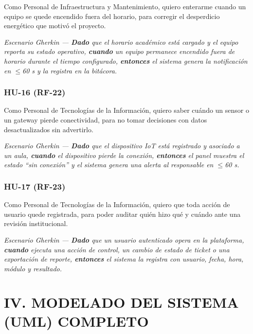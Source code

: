 
Como Personal de Infraestructura y Mantenimiento, quiero enterarme cuando un equipo se quede encendido fuera del horario, para corregir el desperdicio energético que motivó el proyecto.

\textit{Escenario Gherkin --- \textbf{Dado} que el horario académico está cargado y el equipo reporta su estado operativo, \textbf{cuando} un equipo permanece encendido fuera de horario durante el tiempo configurado, \textbf{entonces} el sistema genera la notificación en $\leq$60 s y la registra en la bitácora.}

\subsubsection*{HU-16 (RF-22)}


Como Personal de Tecnologías de la Información, quiero saber cuándo un sensor o un gateway pierde conectividad, para no tomar decisiones con datos desactualizados sin advertirlo.

\textit{Escenario Gherkin --- \textbf{Dado} que el dispositivo IoT está registrado y asociado a un aula, \textbf{cuando} el dispositivo pierde la conexión, \textbf{entonces} el panel muestra el estado ``sin conexión'' y el sistema genera una alerta al responsable en $\leq$60 s.}

\subsubsection*{HU-17 (RF-23)}


Como Personal de Tecnologías de la Información, quiero que toda acción de usuario quede registrada, para poder auditar quién hizo qué y cuándo ante una revisión institucional.

\textit{Escenario Gherkin --- \textbf{Dado} que un usuario autenticado opera en la plataforma, \textbf{cuando} ejecuta una acción de control, un cambio de estado de ticket o una exportación de reporte, \textbf{entonces} el sistema la registra con usuario, fecha, hora, módulo y resultado.}

\section*{IV. MODELADO DEL SISTEMA (UML) COMPLETO}

